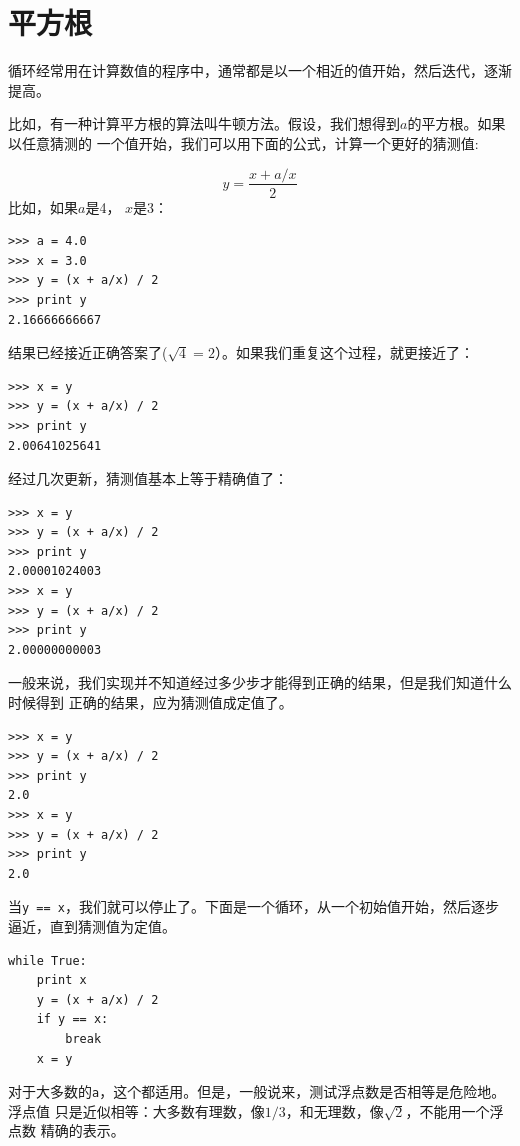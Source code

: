 \section{平方根}

循环经常用在计算数值的程序中，通常都是以一个相近的值开始，然后迭代，逐渐提高。


比如，有一种计算平方根的算法叫牛顿方法。假设，我们想得到$a$的平方根。如果以任意猜测的
一个值开始，我们可以用下面的公式，计算一个更好的猜测值:

\[ y = \frac{x + a/x}{2} \]
比如，如果$a$是4， $x$是3：

\beforeverb
\begin{verbatim}
>>> a = 4.0
>>> x = 3.0
>>> y = (x + a/x) / 2
>>> print y
2.16666666667
\end{verbatim}
\afterverb
%
结果已经接近正确答案了($\sqrt{4} = 2$）。如果我们重复这个过程，就更接近了：

\beforeverb
\begin{verbatim}
>>> x = y
>>> y = (x + a/x) / 2
>>> print y
2.00641025641
\end{verbatim}
\afterverb
经过几次更新，猜测值基本上等于精确值了：

\beforeverb
\begin{verbatim}
>>> x = y
>>> y = (x + a/x) / 2
>>> print y
2.00001024003
>>> x = y
>>> y = (x + a/x) / 2
>>> print y
2.00000000003
\end{verbatim}
\afterverb

一般来说，我们实现并不知道经过多少步才能得到正确的结果，但是我们知道什么时候得到
正确的结果，应为猜测值成定值了。

\beforeverb
\begin{verbatim}
>>> x = y
>>> y = (x + a/x) / 2
>>> print y
2.0
>>> x = y
>>> y = (x + a/x) / 2
>>> print y
2.0
\end{verbatim}
\afterverb

当{\tt y == x}，我们就可以停止了。下面是一个循环，从一个初始值开始，然后逐步逼近，直到猜测值为定值。

\beforeverb
\begin{verbatim}
while True:
    print x
    y = (x + a/x) / 2
    if y == x:
        break
    x = y
\end{verbatim}
\afterverb
%

对于大多数的{\tt a}，这个都适用。但是，一般说来，测试浮点数是否相等是危险地。浮点值
只是近似相等：大多数有理数，像$1/3$，和无理数，像$\sqrt{2}$，不能用一个浮点数
精确的表示。

